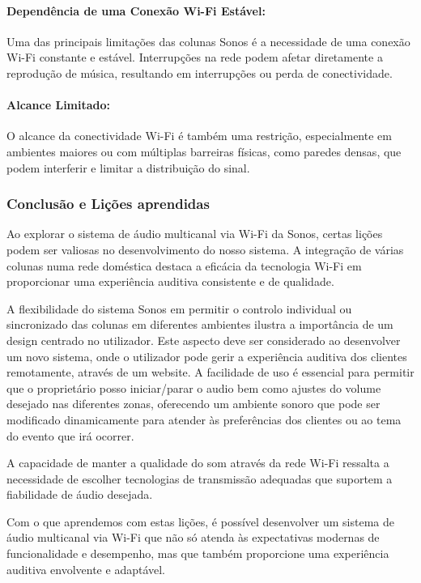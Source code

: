 \documentclass{article}
\begin{document}
\paragraph{Dependência de uma Conexão Wi-Fi Estável:} Uma das principais limitações das colunas Sonos é a necessidade de uma conexão Wi-Fi constante e estável. Interrupções na rede podem afetar diretamente a reprodução de música, resultando em interrupções ou perda de conectividade.

\paragraph{Alcance Limitado:} O alcance da conectividade Wi-Fi é também uma restrição, especialmente em ambientes maiores ou com múltiplas barreiras físicas, como paredes densas, que podem interferir e limitar a distribuição do sinal.

\vspace{1cm}

\subsubsection{Conclusão e Lições aprendidas}

Ao explorar o sistema de áudio multicanal via Wi-Fi da Sonos, certas lições podem ser valiosas no desenvolvimento do nosso sistema. A integração de várias colunas numa rede doméstica destaca a eficácia da tecnologia Wi-Fi em proporcionar uma experiência auditiva consistente e de qualidade.

A flexibilidade do sistema Sonos em permitir o controlo individual ou sincronizado das colunas em diferentes ambientes ilustra a importância de um design centrado no utilizador. Este aspecto deve ser considerado ao desenvolver um novo sistema, onde o utilizador pode gerir a experiência auditiva dos clientes remotamente, através de um website. A facilidade de uso é essencial para permitir que o proprietário posso iniciar/parar o audio bem como ajustes do volume desejado nas diferentes zonas, oferecendo um ambiente sonoro que pode ser modificado dinamicamente para atender às preferências dos clientes ou ao tema do evento que irá ocorrer.

A capacidade de manter a qualidade do som através da rede Wi-Fi ressalta a necessidade de escolher tecnologias de transmissão adequadas que suportem a fiabilidade de áudio desejada.

Com o que aprendemos com estas lições, é possível desenvolver um sistema de áudio multicanal via Wi-Fi que não só atenda às expectativas modernas de funcionalidade e desempenho, mas que também proporcione uma experiência auditiva envolvente e adaptável.
\end{document}
